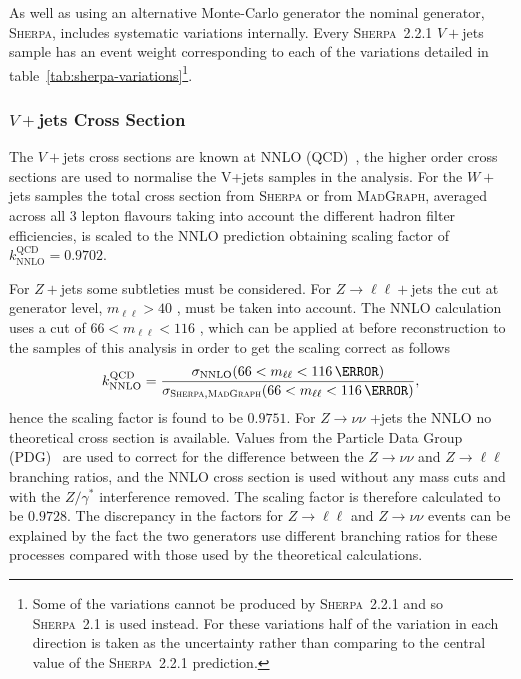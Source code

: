 As well as using an alternative Monte-Carlo generator the nominal generator,
\textsc{Sherpa}, includes systematic variations internally. Every
\textsc{Sherpa}~2.2.1 $V+$jets sample has an event weight corresponding to each
of the variations detailed in table~\ref{tab:sherpa-variations}\footnote{Some of
  the variations cannot be produced by \textsc{Sherpa}~2.2.1 and so
  \textsc{Sherpa}~2.1 is used instead. For these variations half of the
  variation in each direction is taken as the uncertainty rather than comparing
  to the central value of the \textsc{Sherpa}~2.2.1 prediction.}.


\subsubsection{$V+$jets Cross Section}

The $V+$jets cross sections are known at NNLO (QCD)~\cite{Butterworth:1287902},
the higher order cross sections are used to normalise the V+jets samples in the
analysis. For the $W+$jets samples the total cross section from \textsc{Sherpa}
or from \textsc{MadGraph}, averaged across all 3 lepton flavours taking into
account the different hadron filter efficiencies, is scaled to the NNLO
prediction obtaining scaling factor of $k_{\text{NNLO}}^{\text{QCD}} = 0.9702$.

For $Z+$jets some subtleties must be considered. For $Z\to\ell\ell +$jets the
cut at generator level, $m_{\ell\ell}>40$ \GeV, must be taken into account. The
NNLO calculation uses a cut of $66<m_{\ell\ell}<116$ \GeV, which can be applied
at before reconstruction to the samples of this analysis in order to get the
scaling correct as follows
\begin{equation}
  k_{\text{NNLO}}^{\text{QCD}} =
  \frac{\sigma_{\text{NNLO}}(66<m_{\ell\ell}<116\,{\GeV})}%
  {\sigma_{\textsc{Sherpa},\textsc{MadGraph}}(66<m_{\ell\ell}<116\,{\GeV})},
  \label{eq:nnlo-vjets-k}
\end{equation}
hence the scaling factor is found to be $0.9751$. For $Z \to \nu\nu$ +jets the
NNLO no theoretical cross section is available. Values from the
Particle Data Group (PDG)~\cite{PDG} are used to correct for the difference
between the $Z \to \nu\nu$ and $Z \to \ell\ell$ branching ratios, and the NNLO
cross section is used without any mass cuts and with the $Z/\gamma^*$
interference removed. The scaling factor is therefore calculated to be $0.9728$.
The discrepancy in the factors for $Z\to\ell\ell$ and $Z\to\nu\nu$ events can be
explained by the fact the two generators use different branching ratios for
these processes compared with those used by the theoretical calculations.

